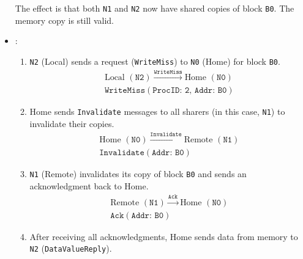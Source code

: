 \begin{itemize}
\begin{figure}[!htp]
    \end{figure}
    The effect is that both \texttt{N1} and \texttt{N2} now have shared copies of block \texttt{B0}. The memory copy is still valid.

    \item {}:
    \begin{enumerate}
        \item \texttt{N2} (Local) sends a request (\texttt{WriteMiss}) to \texttt{N0} (Home) for block \texttt{B0}.
        \begin{gather*}
            \text{Local } (\texttt{N2}) \xrightarrow{\texttt{WriteMiss}} \text{Home } (\texttt{N0})
            \\[.3em]
            \texttt{WriteMiss}(\texttt{ProcID: 2, Addr: B0})
        \end{gather*}
        \item Home sends \texttt{Invalidate} messages to all sharers (in this case, \texttt{N1}) to invalidate their copies.
        \begin{gather*}
            \text{Home } (\texttt{N0}) \xrightarrow{\texttt{Invalidate}} \text{Remote } (\texttt{N1})
            \\[.3em]
            \texttt{Invalidate}(\texttt{Addr: B0})
        \end{gather*}
        \item \texttt{N1} (Remote) invalidates its copy of block \texttt{B0} and sends an acknowledgment back to Home.
        \begin{gather*}
            \text{Remote } (\texttt{N1}) \xrightarrow{\texttt{Ack}} \text{Home } (\texttt{N0})
            \\[.3em]
            \texttt{Ack}(\texttt{Addr: B0})
        \end{gather*}
        \item After receiving all acknowledgments, Home sends data from memory to \texttt{N2} (\texttt{DataValueReply}).

\end{enumerate}
\end{itemize}
